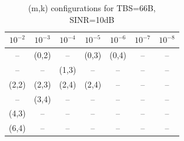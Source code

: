 \begin{table}[ht]
\centering
\caption{(m,k) configurations for TBS=66B, SINR=10dB}
\label{tab:conf_{66B_10dB}}
\begin{tabular}{ccccccc}
\hline
$10^{-2}$ & $10^{-3}$ & $10^{-4}$ & $10^{-5}$ & $10^{-6}$ & $10^{-7}$ & $10^{-8}$ \\ \hline
-- & (0,2) & -- & (0,3) & (0,4) & -- & -- \\
-- & -- & (1,3) & -- & -- & -- & -- \\
(2,2) & (2,3) & (2,4) & (2,4) & -- & -- & -- \\
-- & (3,4) & -- & -- & -- & -- & -- \\
(4,3) & -- & -- & -- & -- & -- & -- \\
(6,4) & -- & -- & -- & -- & -- & -- \\
\hline
\end{tabular}
\end{table}